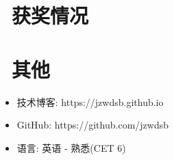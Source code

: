 \documentclass{resume}
\begin{document}
\section{\faHeartO\ 获奖情况}

\section{\faInfo\ 其他}
\begin{itemize}[parsep=0.5ex]
  \item 技术博客: https://jzwdsb.github.io
  \item GitHub: https://github.com/jzwdsb
  \item 语言: 英语 - 熟悉(CET 6)
\end{itemize}

%
%
\end{document}
